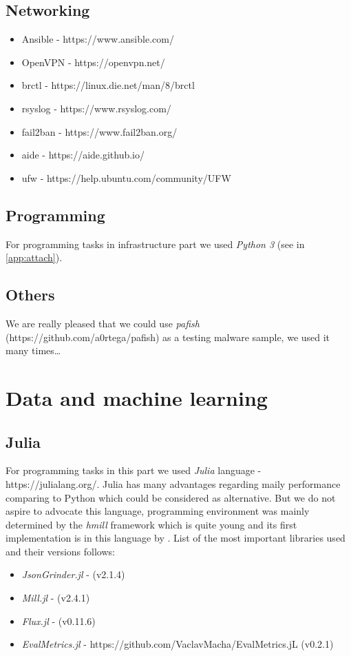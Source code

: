 \subsection*{Networking}
\begin{itemize}
  \itemsep0em 
  \item Ansible - https://www.ansible.com/
  \item OpenVPN - https://openvpn.net/
  \item brctl - https://linux.die.net/man/8/brctl
  \item rsyslog - https://www.rsyslog.com/
  \item fail2ban - https://www.fail2ban.org/
  \item aide - https://aide.github.io/
  \item ufw - https://help.ubuntu.com/community/UFW
\end{itemize}

\subsection*{Programming}
For programming tasks in infrastructure part we used \emph{Python 3} (see in \ref{app:attach}).
\subsection*{Others}
We are really pleased that we could use \emph{pafish} (https://github.com/a0rtega/pafish) as a testing malware sample, we used it many times\dots

\section*{Data and machine learning}
\subsection*{Julia}
For programming tasks in this part we used \emph{Julia} language - https://julialang.org/. Julia has many advantages regarding maily performance comparing to Python which could be considered as alternative. But we do not aspire to advocate this language, programming environment was mainly determined by the \emph{hmill} framework which is quite young and its first implementation is in this language by \cite{Mandlik2020}. List of the most important libraries used and their versions follows:
\begin{itemize}
  \itemsep0em 
  \item \emph{JsonGrinder.jl} - \cite{Pevny2019} (v2.1.4)
  \item \emph{Mill.jl} - \cite{Pevny2018} (v2.4.1)
  \item \emph{Flux.jl} - \cite{Innes2018a, Innes2018} (v0.11.6)
  \item \emph{EvalMetrics.jl} - https://github.com/VaclavMacha/EvalMetrics.jL (v0.2.1)
\end{itemize}

